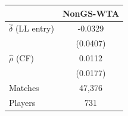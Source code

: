 \begin{tabular}{lc}
\toprule
 & NonGS-WTA \\
\midrule
$\hat{\delta}$ (LL entry) & -0.0329 \\
 & (0.0407) \\
$\hat{\rho}$ (CF) & 0.0112 \\
 & (0.0177) \\
\midrule
Matches & 47,376 \\
Players & 731 \\
\bottomrule
\end{tabular}
